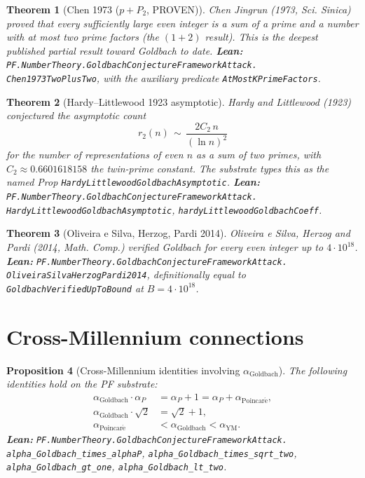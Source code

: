 \documentclass[11pt,a4paper]{article}
\theoremstyle{plain}
\newtheorem{theorem}{Theorem}[section]
\newtheorem{proposition}[theorem]{Proposition}
\theoremstyle{definition}
\begin{document}
\begin{theorem}[Chen 1973 ($p + P_{2}$, PROVEN)]
\label{thm:chen}
Chen Jingrun (1973, \emph{Sci. Sinica}) proved that every sufficiently
large even integer is a sum of a prime and a number with at most two
prime factors (the $(1+2)$ result). This is the deepest published
partial result toward Goldbach to date.
\textbf{Lean:}
\texttt{PF.NumberTheory.GoldbachConjectureFrameworkAttack.\\
Chen1973TwoPlusTwo}, with the auxiliary predicate
\texttt{AtMostKPrimeFactors}.
\end{theorem}

\begin{theorem}[Hardy--Littlewood 1923 asymptotic]
\label{thm:hl}
Hardy and Littlewood (1923) conjectured the asymptotic count
\[
r_{2}(n) \,\sim\, \frac{2 C_{2}\, n}{(\ln n)^{2}}
\]
for the number of representations of even $n$ as a sum of two primes,
with $C_{2} \approx 0.6601618158$ the twin-prime constant. The
substrate types this as the named Prop
\texttt{HardyLittlewoodGoldbachAsymptotic}.
\textbf{Lean:}
\texttt{PF.NumberTheory.GoldbachConjectureFrameworkAttack.\\
HardyLittlewoodGoldbachAsymptotic},
\texttt{hardyLittlewoodGoldbachCoeff}.
\end{theorem}

\begin{theorem}[Oliveira e Silva, Herzog, Pardi 2014]
\label{thm:oliveira}
Oliveira e Silva, Herzog and Pardi (2014, \emph{Math. Comp.}) verified
Goldbach for every even integer up to $4 \cdot 10^{18}$.
\textbf{Lean:}
\texttt{PF.NumberTheory.GoldbachConjectureFrameworkAttack.\\
OliveiraSilvaHerzogPardi2014},
definitionally equal to \texttt{GoldbachVerifiedUpToBound} at
$B = 4 \cdot 10^{18}$.
\end{theorem}

\section{Cross-Millennium connections}
\label{sec:cross}

\begin{proposition}[Cross-Millennium identities involving $\alpha_{\mathrm{Goldbach}}$]
\label{prop:cross-goldbach}
The following identities hold on the PF substrate:
\[
\begin{aligned}
\alpha_{\mathrm{Goldbach}} \cdot \alpha_{P}
  &= \alpha_{P} + 1
  = \alpha_{P} + \alpha_{\mathrm{Poincar\acute e}}, \\
\alpha_{\mathrm{Goldbach}} \cdot \sqrt{2}
  &= \sqrt{2} + 1, \\
\alpha_{\mathrm{Poincar\acute e}}
  &< \alpha_{\mathrm{Goldbach}}
  < \alpha_{\mathrm{YM}}.
\end{aligned}
\]
\textbf{Lean:}
\texttt{PF.NumberTheory.GoldbachConjectureFrameworkAttack.\\
alpha\_Goldbach\_times\_alphaP},
\texttt{alpha\_Goldbach\_times\_sqrt\_two},
\texttt{alpha\_Goldbach\_gt\_one},
\texttt{alpha\_Goldbach\_lt\_two}.
\end{proposition}
\end{document}
